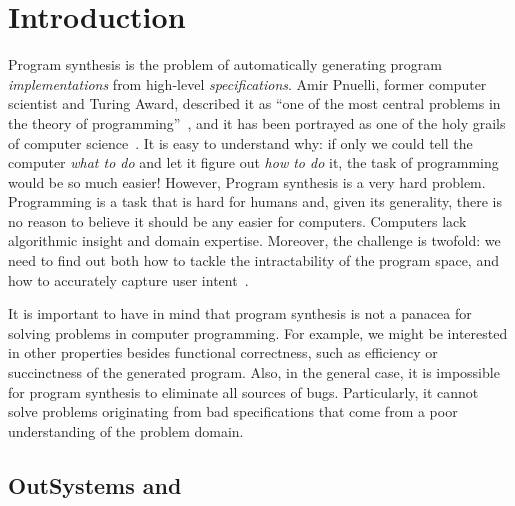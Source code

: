 \section{Introduction}
\label{sec:introduction}

Program synthesis is the problem of automatically generating program
\textit{implementations} from high-level \textit{specifications}.
Amir Pnuelli, former computer scientist and Turing Award, described it as ``one
of the most central problems in the theory of
programming''~\cite{Pnueli:1989:ARM}, and it has been portrayed as one of the
holy grails of computer science~\cite{Solar-Lezama:2008,Gulwani2017}.
It is easy to understand why: if only we could tell the computer \textit{what to
do} and let it figure out \textit{how to do} it, the task of programming would
be so much easier!
However, Program synthesis is a very hard problem.
Programming is a task that is hard for humans and, given its generality,
there is no reason to believe it should be any easier for computers.
Computers lack algorithmic insight and domain expertise.
Moreover, the challenge is twofold: we need to find out both how to tackle the
intractability of the program space, and how to accurately capture user
intent~\cite{Gulwani2017}.

It is important to have in mind that program synthesis is not a panacea for
solving problems in computer programming.
For example, we might be interested in other properties besides functional
correctness, such as efficiency or succinctness of the generated program.
Also, in the general case, it is impossible for program synthesis to eliminate
all sources of bugs.
Particularly, it cannot solve problems originating from bad specifications
that come from a poor understanding of the problem domain.

\subsection{OutSystems and }
\label{sec:outsystems-pbe}

